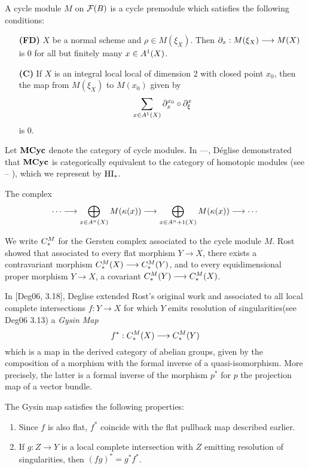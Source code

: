 \begin{definition}
A cycle module $M$ on $\fields(B)$ is a cycle premodule which
satisfies the following conditions:

\begin{enumerate}
\item[\textbf{(FD)}]  
$X$ be a normal scheme and $\rho \in M(\xi_X)$. Then $\res{x}: 
M(\xi_X) \to M(X)$ is 0 for all but finitely many $x \in 
\subsch{1}{X}$.

\item[\textbf{(C)}]  If $X$ is an integral
local local of dimension 2 with closed point $x_0$, then the map 
from $M(\xi_X)$ to $M(x_0)$ given by
\[
\sum_{x \in \subsch{1}{X}} \ptres{x_0}{x} \comp \ptres{x}{\xi}
\]
is 0.
\end{enumerate}
\end{definition}

Let $\Cat{MCyc}$ denote the category of cycle modules. In ---,
D\'eglise demonstrated that $\Cat{MCyc}$ is categorically 
equivalent to the category of homotopic modules (see -- ), which
we represent by $\HI_*$. 

\vskip 10pt
The complex \[\gersseq{M}\]

We write $\gcmplx{M}$ for the Gersten complex associated to the 
cycle module $M$. Rost showed that associated to every flat 
morphism $Y \to X$, there exists a contravariant morphism 
$\gcmplx{M}(X) \to \gcmplx{M}(Y)$, and to every equidimensional 
proper morphism $Y \to X$, a covariant $\gcmplx{M}(Y) \to 
\gcmplx{M}(X)$.

In [Deg06, 3.18], Deglise extended Rost's original work and 
associated to all local complete intersections $f: Y \to X$ for
which $Y$ emits resolution of singularities(see Deg06 3.13) a 
\emph{Gysin Map} 
\[
   f^*: \gcmplx{M}(X) \to \gcmplx{M}(Y)
\]
which is a map in the derived category of abelian groups, given 
by the composition of a morphism with the formal inverse of a 
quasi-isomorphism. More precisely, the latter is a formal inverse 
of the morphism $p^*$ for $p$ the projection map of a vector 
bundle. 

The Gysin map satisfies the following properties:
\begin{enumerate}
\item Since $f$ is also flat, $f^*$ coincide with the flat 
pullback map described earlier.

\item If $g: Z \to Y$ is a local complete intersection with $Z$
emitting resolution of singularities, then $(fg)^* = g^*f^*$.
\end{enumerate}


